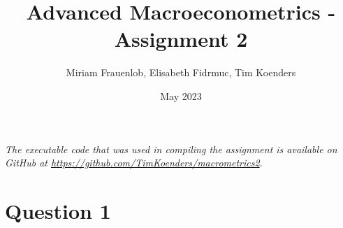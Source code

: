 \documentclass{article}
\title{Advanced Macroeconometrics - Assignment 2}
\author{Miriam Frauenlob, Elisabeth Fidrmuc, Tim Koenders }
\date{May 2023}
\numberwithin{equation}{section}
\begin{document}
\maketitle

\begin{tcolorbox}
\centering \itshape The executable code that was used in compiling the assignment is available on GitHub at \href{https://github.com/TimKoenders/macrometrics2}{https://github.com/TimKoenders/macrometrics2}.
\end{tcolorbox}

\section{Question 1}
\end{document}
